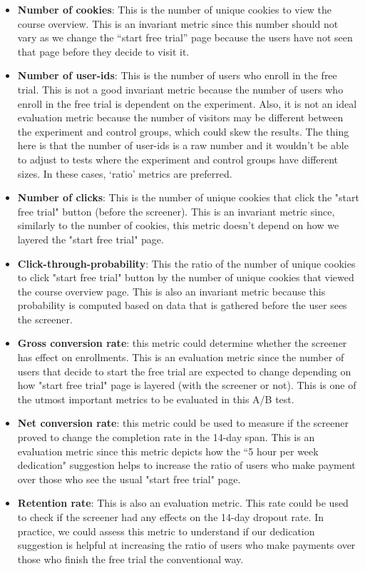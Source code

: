 \documentclass[11pt]{article}
\begin{document}
	\begin{itemize}
		\item \textbf{Number of cookies}: This is the number of unique cookies to view the course overview. This is an invariant metric since this number should not vary as we change the ``start free trial'' page because the users have not seen that page before they decide to visit it.
		\item \textbf{Number of user-ids}: This is the number of users who enroll in the free trial. This is not a good invariant metric because the number of users who enroll in the free trial is dependent on the experiment. Also, it is not an ideal evaluation metric because the number of visitors may be different between the experiment and control groups, which could skew the results. The thing here is that the number of user-ids is a raw number and it wouldn't be able to adjust to tests where the experiment and control groups have different sizes. In these cases, `ratio' metrics are preferred.		
		\item \textbf{Number of clicks}: This is the number of unique cookies that click the "start free trial" button (before the screener). This is an invariant metric since, similarly to the number of cookies, this metric doesn't depend on how we layered the "start free trial" page.
		\item \textbf{Click-through-probability}: This the ratio of the number of unique cookies to click "start free trial" button by the number of unique cookies that viewed the course overview page. This is also an invariant metric because this probability is computed based on data that is gathered before the user sees the screener.
		\item \textbf{Gross conversion rate}: this metric could determine whether the screener has effect on enrollments. This is an evaluation metric since the number of users that decide to start the free trial are expected to change depending on how "start free trial" page is layered (with the screener or not). This is one of the utmost important metrics to be evaluated in this A/B test.
		\item \textbf{Net conversion rate}: this metric could be used to measure if the screener proved to change the completion rate in the 14-day span. This is an evaluation metric since this metric depicts how the  ``5 hour per week dedication" suggestion helps to increase the ratio of users who make payment over those who see the usual "start free trial" page.
		\item \textbf{Retention rate}: This is also an evaluation metric. This rate could be used to check if the screener had any effects on the 14-day dropout rate. In practice, we could assess this metric to understand if our dedication suggestion is helpful at increasing the ratio of users who make payments over those who finish the free trial the conventional way.
	\end{itemize}
	
\end{document}
